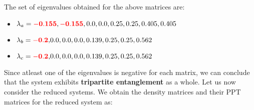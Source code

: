 \documentclass{scrartcl}
\begin{document}
        The set of eigenvalues obtained for the above matrices are: 
        \begin{itemize}
            \item $\lambda_a =\mathbf{\mathcolor{red}{-0.155}}, \mathbf{\mathcolor{red}{-0.155}}, 0.0, 0.0, 0.25, 0.25, 0.405, 0.405$
            \item $\lambda_b = \mathbf{\mathcolor{red}{-0.2}, }0.0, 0.0, 0.0, 0.139, 0.25, 0.25, 0.562$
            \item $\lambda_c = \mathbf{\mathcolor{red}{-0.2}, }0.0, 0.0, 0.0, 0.139, 0.25, 0.25, 0.562$
        \end{itemize}
        Since atleast one of the eigenvalues is negative for each matrix, we can conclude that the system exhibits \textbf{tripartite entanglement} as a whole. Let us now consider the reduced systems. We obtain the density matrices and their PPT matrices for the reduced system as:
\end{document}
